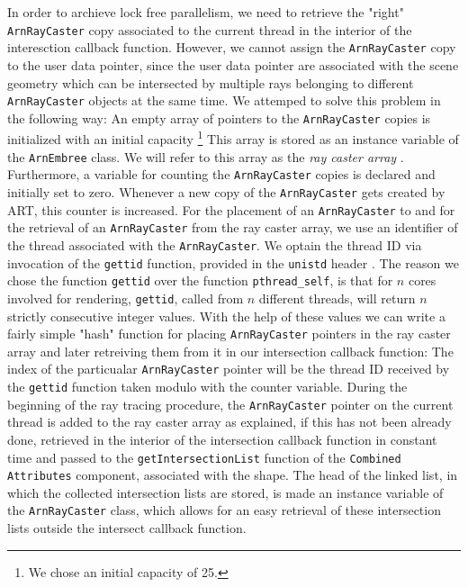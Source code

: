 In order to archieve lock free parallelism, we need to retrieve the "right" \texttt{ArnRayCaster} copy associated to the current thread in the interior of the interesction callback function. However, we cannot assign the \texttt{ArnRayCaster} copy to the user data pointer, since the user data pointer are associated with the scene geometry which can be intersected by multiple rays belonging to different \texttt{ArnRayCaster} objects at the same time.
We attemped to solve this problem in the following way: An empty array of pointers to the \texttt{ArnRayCaster} copies is initialized with an initial capacity \footnote{We chose an initial capacity of 25.} This array is stored as an instance variable of the \texttt{ArnEmbree} class. We will refer to this array as the \emph{ray caster array} . Furthermore, a variable for counting the \texttt{ArnRayCaster} copies is declared and initially set to zero. Whenever a new copy of the \texttt{ArnRayCaster} gets created by ART, this counter is increased.
For the placement of an \texttt{ArnRayCaster} to and for the retrieval of an \texttt{ArnRayCaster} from the ray caster array, we use an identifier of the thread associated with the \texttt{ArnRayCaster}. We optain the thread ID via invocation of the \texttt{gettid} function, provided in the \texttt{unistd} header . The reason we chose the function \texttt{gettid} over the function \texttt{pthread\_self}, is that for $n$ cores involved for rendering, \texttt{gettid}, called from $n$ different threads, will return $n$ strictly  consecutive integer values. With the help of these values we can write a fairly simple "hash" function for placing \texttt{ArnRayCaster} pointers in the ray caster array and later retreiving them from it in our intersection callback function: The index of the particualar \texttt{ArnRayCaster} pointer will be the thread ID received by the \texttt{gettid} function taken modulo with the counter variable.
During the beginning of the ray tracing procedure, the \texttt{ArnRayCaster} pointer on the current thread is added to the ray caster array as explained, if this has not been already done, retrieved in the interior of the intersection callback function in constant time and passed to the \texttt{getIntersectionList} function of the \texttt{Combined Attributes} component, associated with the shape. The head of the linked list, in which the collected intersection lists are stored, is made an instance variable of the \texttt{ArnRayCaster} class, which allows for an easy retrieval of these intersection lists outside the intersect callback function. 

